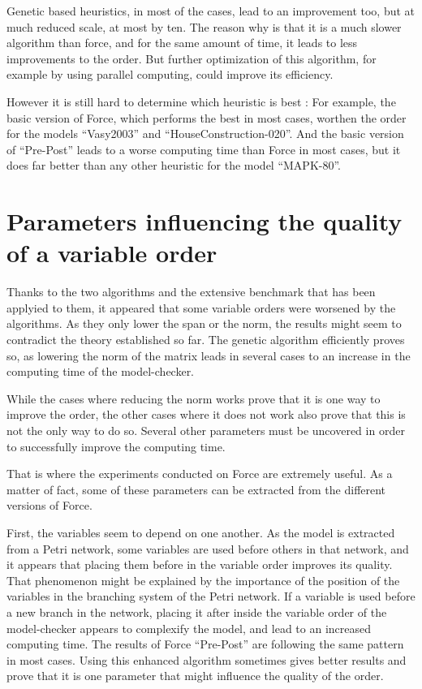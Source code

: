 \documentclass[12pt]{report}
\begin{document}
Genetic based heuristics, in most of the cases, lead to an improvement too, but at much reduced scale, at most by ten. The reason why is that it is a much slower algorithm than force, and for the same amount of time, it leads to less improvements to the order. But further optimization of this algorithm, for example by using parallel computing, could improve its efficiency.

However it is still hard to determine which heuristic is best : For example, the basic version of Force, which performs the best in most cases, worthen the order for the models \enquote{Vasy2003} and \enquote{HouseConstruction-020}. And the basic version of \enquote{Pre-Post} leads to a worse computing time than Force in most cases, but it does far better than any other heuristic for the model \enquote{MAPK-80}.

\chapter{Parameters influencing the quality of a variable order}

Thanks to the two algorithms and the extensive benchmark that has been applyied to them, it appeared that some variable orders were worsened by the algorithms. As they only lower the span or the norm, the results might seem to contradict the theory established so far.
The genetic algorithm efficiently proves so, as lowering the norm of the matrix leads in several cases to an increase in the computing time of the model-checker. 

While the cases where reducing the norm works prove that it is one way to improve the order, the other cases where it does not work also prove that this is not the only way to do so. Several other parameters must be uncovered in order to successfully improve the computing time.

That is where the experiments conducted on Force are extremely useful. As a matter of fact, some of these parameters can be extracted from the different versions of Force.

First, the variables seem to depend on one another. As the model is extracted from a Petri network, some variables are used before others in that network, and it appears that placing them before in the variable order improves its quality. That phenomenon might be explained by the importance of the position of the variables in the branching system of the Petri network. If a variable is used before a new branch in the network, placing it after inside the variable order of the model-checker appears to complexify the model, and lead to an increased computing time. The results of Force \enquote{Pre-Post} are following the same pattern in most cases. Using this enhanced algorithm sometimes gives better results and prove that it is one parameter that might influence the quality of the order.
\end{document}
